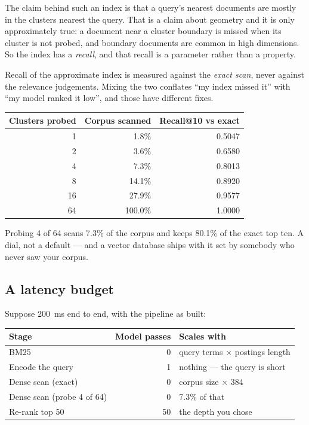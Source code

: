 \documentclass[11pt,a4paper]{article}
\begin{document}
The claim behind such an index is that a query's nearest documents are mostly
in the clusters nearest the query. That is a claim about geometry and it is
only approximately true: a document near a cluster boundary is missed when its
cluster is not probed, and boundary documents are common in high dimensions. So
the index has a \emph{recall}, and that recall is a parameter rather than a
property.

\begin{failbox}[title={Failure condition --- index recall and model quality, conflated}]
Recall of the approximate index is measured against the \emph{exact scan},
never against the relevance judgements. Mixing the two conflates ``my index
missed it'' with ``my model ranked it low'', and those have different fixes.
\end{failbox}

\begin{center}
\small
\begin{tabular}{rrr}
\toprule
\textbf{Clusters probed} & \textbf{Corpus scanned} &
\textbf{Recall@10 vs exact} \\
\midrule
1  & 1.8\%   & 0.5047 \\
2  & 3.6\%   & 0.6580 \\
4  & 7.3\%   & 0.8013 \\
8  & 14.1\%  & 0.8920 \\
16 & 27.9\%  & 0.9577 \\
64 & 100.0\% & 1.0000 \\
\bottomrule
\end{tabular}
\end{center}

Probing 4 of 64 scans 7.3\% of the corpus and keeps 80.1\% of the exact top
ten. A dial, not a default --- and a vector database ships with it set by
somebody who never saw your corpus.

\subsection{A latency budget}

Suppose 200~ms end to end, with the pipeline as built:

\begin{center}
\small
\begin{tabular}{lrl}
\toprule
\textbf{Stage} & \textbf{Model passes} & \textbf{Scales with} \\
\midrule
BM25                            & 0  & query terms $\times$ postings length \\
Encode the query                & 1  & nothing --- the query is short \\
Dense scan (exact)              & 0  & corpus size $\times$ 384 \\
Dense scan (probe 4 of 64)      & 0  & 7.3\% of that \\
Re-rank top 50                  & 50 & the depth you chose \\
\bottomrule
\end{tabular}
\end{center}
\end{document}
